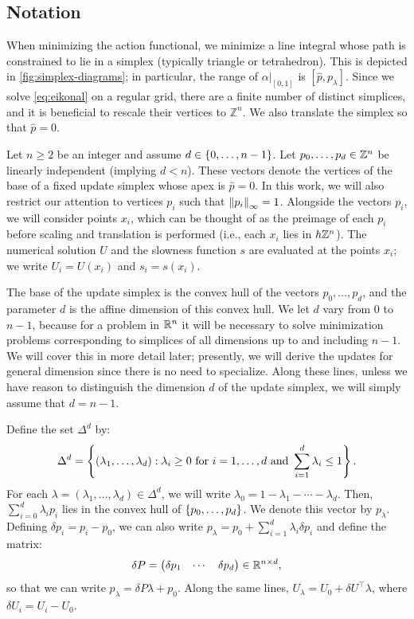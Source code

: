 \documentclass[sisc-eikonal.tex]{subfiles}
\begin{document}
\subsection{Notation}

When minimizing the action functional, we minimize a line integral
whose path is constrained to lie in a simplex (typically triangle or
tetrahedron). This is depicted in \cref{fig:simplex-diagrams}; in
particular, the range of $\left. \alpha \right|_{[0, 1]}$ is
$[\hat{p}, p_{\lambda}]$. Since we solve \cref{eq:eikonal} on a
regular grid, there are a finite number of distinct simplices, and it
is beneficial to rescale their vertices to $\mathbb{Z}^n$. We also
translate the simplex so that $\hat{p} = 0$.

Let $n \geq 2$ be an integer and assume
$d \in \left\{0, \hdots, n - 1\right\}$. Let $p_0, \hdots, p_d \in \mathbb{Z}^n$ be
linearly independent (implying $d < n$). These vectors denote the
vertices of the base of a fixed update simplex whose apex is
$\hat{p} = 0$. In this work, we will also restrict our attention to
vertices $p_i$ such that $\left\|p_i\right\|_\infty = 1$. Alongside the
vectors $p_i$, we will consider points $x_i$, which can be thought of
as the preimage of each $p_i$ before scaling and translation is
performed (i.e., each $x_i$ lies in $h \mathbb{Z}^n$). The numerical solution
$U$ and the slowness function $s$ are evaluated at the points $x_i$;
we write $U_i = U(x_i)$ and $s_i = s(x_i)$.

The base of the update simplex is the convex hull of the vectors
$p_0, \hdots, p_d$, and the parameter $d$ is the affine dimension of
this convex hull. We let $d$ vary from $0$ to $n - 1$, because for a
problem in $\mathbb{R}^n$ it will be necessary to solve minimization problems
corresponding to simplices of all dimensions up to and including
$n - 1$. We will cover this in more detail later; presently, we will
derive the updates for general dimension since there is no need to
specialize. Along these lines, unless we have reason to distinguish
the dimension $d$ of the update simplex, we will simply assume that
$d = n - 1$.

Define the set $\Delta^d$ by:
\begin{equation}
  \Delta^d = \left\{(\lambda_1, \hdots, \lambda_d) : \lambda_i \geq 0 \mbox{ for } i = 1, \hdots, d \mbox{ and } \sum_{i=1}^d \lambda_i \leq 1\right\}.
\end{equation}
For each $\lambda = (\lambda_1, \hdots, \lambda_d) \in \Delta^d$, we
will write $\lambda_0 = 1 - \lambda_1 - \cdots - \lambda_d$. Then,
$\sum_{i=0}^d \lambda_i p_i$ lies in the convex hull of
$\left\{p_0, \hdots, p_d\right\}$. We denote this vector by
$p_\lambda$. Defining $\delta p_i = p_i - p_0$, we can also write
$p_\lambda = p_0 + \sum_{i=1}^d \lambda_i \delta p_i$ and define the
matrix:
\begin{equation}
  \delta P = \begin{pmatrix} \delta p_1 & \cdots & \delta p_d \end{pmatrix} \in \mathbb{R}^{n \times d},
\end{equation}
so that we can write $p_\lambda = \delta P \lambda + p_0$. Along the
same lines, $U_\lambda = U_0 + \delta U^\top \lambda$, where
$\delta U_i = U_i - U_0$.
\end{document}
